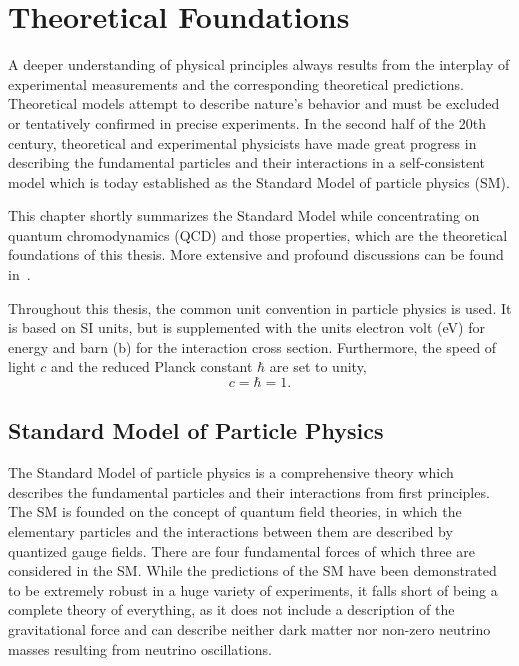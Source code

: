 
\chapter{Theoretical Foundations}
\label{sec:theoretical_foundations}

A deeper understanding of physical principles always results from the interplay
of experimental measurements and the corresponding theoretical predictions.
Theoretical models attempt to describe nature's behavior and must be excluded or
tentatively confirmed in precise experiments. In the second half of the 20th
century, theoretical and experimental physicists have made great progress in
describing the fundamental particles and their interactions in a self-consistent
model which is today established as the Standard Model of particle physics (SM).

This chapter shortly summarizes the Standard Model while concentrating on
quantum chromodynamics (QCD) and those properties, which are the theoretical
foundations of this thesis. More extensive and profound discussions can be found
in~\cite{Peskin:1995ev,Agashe:2014kda,Ellis:1991qj,Buckley:2011ms}.

Throughout this thesis, the common unit convention in particle physics is used.
It is based on SI units, but is supplemented with the units electron volt
(\si{\electronvolt}) for energy and barn (\si{\barn}) for the interaction cross
section. Furthermore, the speed of light $c$ and the reduced Planck constant
$\hbar$ are set to unity,
%
\begin{equation*}
    c = \hbar = 1.
\end{equation*}

\section{Standard Model of Particle Physics}

The Standard Model of particle physics is a comprehensive theory  which
describes the fundamental particles and their interactions from first
principles. The SM is founded on the concept of quantum field theories, in which
the elementary particles and the interactions between them are described by
quantized gauge fields. There are four fundamental forces of which three are
considered in the SM. While the predictions of the SM have been demonstrated to
be extremely robust in a huge variety of experiments, it falls short of being a
complete theory of everything, as it does not include a description of the
gravitational force and can describe neither dark matter nor non-zero neutrino
masses resulting from neutrino oscillations.

